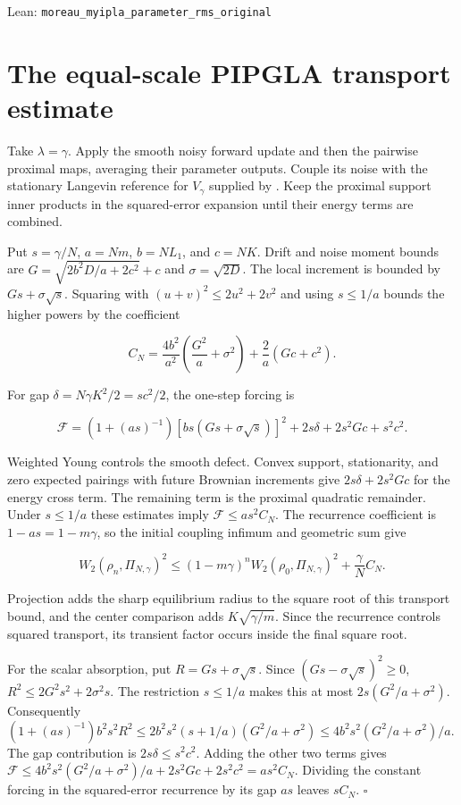 \documentclass[11pt,a4paper]{report}
\begin{document}
\begin{leanbox}{Lean: \texttt{moreau\_\allowbreak{}myipla\_\allowbreak{}parameter\_\allowbreak{}rms\_\allowbreak{}original}}
\end{leanbox}
\section{\texorpdfstring{The equal-scale PIPGLA transport estimate}{The equal-scale PIPGLA transport estimate}}



Take \(\lambda=\gamma\). Apply the smooth noisy forward update and then the pairwise proximal maps, averaging their parameter outputs. Couple its noise with the stationary Langevin reference for \(V_\gamma\) supplied by \cite[Section~3.42.7]{LangevinLean2026ULASC}. Keep the proximal support inner products in the squared-error expansion until their energy terms are combined.



Put \(s=\gamma/N\), \(a=Nm\), \(b=NL_1\), and \(c=NK\). Drift and noise moment bounds are \(G=\sqrt{2b^2D/a+2c^2}+c\) and \(\sigma=\sqrt{2D}\). The local increment is bounded by \(Gs+\sigma\sqrt s\). Squaring with \((u+v)^2\le2u^2+2v^2\) and using \(s\le1/a\) bounds the higher powers by the coefficient

\[C_N=\frac{4b^2}{a^2}\left(\frac{G^2}{a}+\sigma^2\right)+\frac2a(Gc+c^2).\]

For gap \(\delta=N\gamma K^2/2=sc^2/2\), the one-step forcing is

\[\mathcal F=(1+(as)^{-1})[bs(Gs+\sigma\sqrt s)]^2+2s\delta+2s^2Gc+s^2c^2.\]

Weighted Young controls the smooth defect. Convex support, stationarity, and zero expected pairings with future Brownian increments give \(2s\delta+2s^2Gc\) for the energy cross term. The remaining term is the proximal quadratic remainder. Under \(s\le1/a\) these estimates imply \(\mathcal F\le as^2C_N\). The recurrence coefficient is \(1-a s=1-m\gamma\), so the initial coupling infimum and geometric sum give

\[W_2(\rho_n,\Pi_{N,\gamma})^2
\le(1-m\gamma)^nW_2(\rho_0,\Pi_{N,\gamma})^2+\frac\gamma N C_N.\]

Projection adds the sharp equilibrium radius to the square root of this transport bound, and the center comparison adds \(K\sqrt{\gamma/m}\). Since the recurrence controls squared transport, its transient factor occurs inside the final square root.




For the scalar absorption, put \(R=Gs+\sigma\sqrt s\). Since \((Gs-\sigma\sqrt s)^2\ge0\), \(R^2\le2G^2s^2+2\sigma^2s\). The restriction \(s\le1/a\) makes this at most \(2s(G^2/a+\sigma^2)\). Consequently \((1+(as)^{-1})b^2s^2R^2\le2b^2s^2(s+1/a)(G^2/a+\sigma^2)\le4b^2s^2(G^2/a+\sigma^2)/a\). The gap contribution is \(2s\delta\le s^2c^2\). Adding the other two terms gives \(\mathcal F\le4b^2s^2(G^2/a+\sigma^2)/a+2s^2Gc+2s^2c^2=as^2C_N\). Dividing the constant forcing in the squared-error recurrence by its gap \(as\) leaves \(sC_N\). \(\square\)
\end{document}
